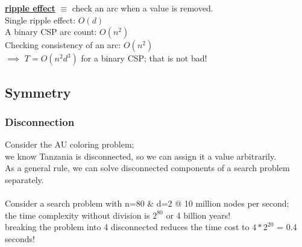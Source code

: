 \documentclass[../../lecture_notes.tex]{subfiles}
\begin{document}
\begin{center}  \end{center}
\textbf{\underline{ripple effect}} $\equiv$ check an arc when a value is removed.\\
Single ripple effect: $O(d)$\\
\indent \indent A binary CSP arc count: $O(n^2)$\\
\indent \indent \indent Checking consistency of an arc: $O(n^2)$\\
$\implies$ $T = O(n^2d^3)$ for a binary CSP; that is not bad!

\subsection*{Symmetry}

\subsubsection*{Disconnection}
\noindent Consider the AU coloring problem;\\
\indent we know Tanzania is disconnected, so we can assign it a value arbitrarily.\\
As a general rule, we can solve disconnected components of a search problem separately.\\
\\
Consider a search problem with n=80 \& d=2 @ 10 million nodes per second;\\
\indent the time complexity without division is $2^80$ or 4 billion years!\\
\indent breaking the problem into 4 disconnected reduces the time cost to $4*2^20$ = 0.4 seconds!\\
\end{document}
